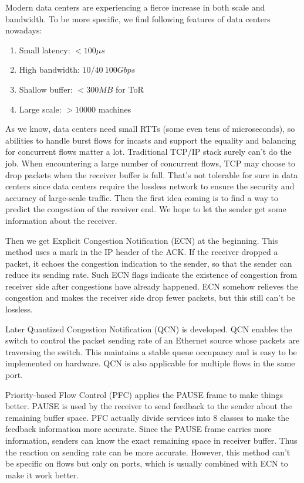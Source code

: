 \documentclass[12pt,a4paper]{article}
\begin{document}
Modern data centers are experiencing a fierce increase in both scale and bandwidth.
To be more specific, we find following features of data centers nowadays:
\begin{enumerate}
	\item Small latency: $<100\mu s$
	\item High bandwidth: $10/40~100Gbps$
	\item Shallow buffer: $<300MB$ for ToR
	\item Large scale: $>10000$ machines
\end{enumerate}

As we know, data centers need small RTTs (some even tens of microseconds),
so abilities to handle burst flows for incasts and support the equality and balancing for concurrent flows matter a lot.
Traditional TCP/IP stack surely can't do the job.
When encountering a large number of concurrent flows, TCP may choose to drop packets when the receiver buffer is full.
That's not tolerable for sure in data centers since data centers require the lossless network to ensure the security and accuracy of large-scale traffic.
Then the first idea coming is to find a way to predict the congestion of the receiver end.
We hope to let the sender get some information about the receiver.

Then we get Explicit Congestion Notification (ECN) \cite{ECN} at the beginning.
This method uses a mark in the IP header of the ACK.
If the receiver dropped a packet, it echoes the congestion indication to the sender, so that the sender can reduce its sending rate.
Such ECN flags indicate the existence of congestion from receiver side after congestions have already happened.
ECN somehow relieves the congestion and makes the receiver side drop fewer packets, but this still can't be lossless.

Later Quantized Congestion Notification (QCN) \cite{QCN} is developed.
QCN enables the switch to control the packet sending rate of an Ethernet source whose packets are traversing the switch.
This maintains a stable queue occupancy and is easy to be implemented on hardware.
QCN is also applicable for multiple flows in the same port.

Priority-based Flow Control (PFC) \cite{PFC} applies the PAUSE frame to make things better.
PAUSE is used by the receiver to send feedback to the sender about the remaining buffer space.
PFC actually divide services into 8 classes to make the feedback information more accurate.
Since the PAUSE frame carries more information, senders can know the exact remaining space in receiver buffer.
Thus the reaction on sending rate can be more accurate.
However, this method can't be specific on flows but only on ports, which is usually combined with ECN to make it work better.
\end{document}
